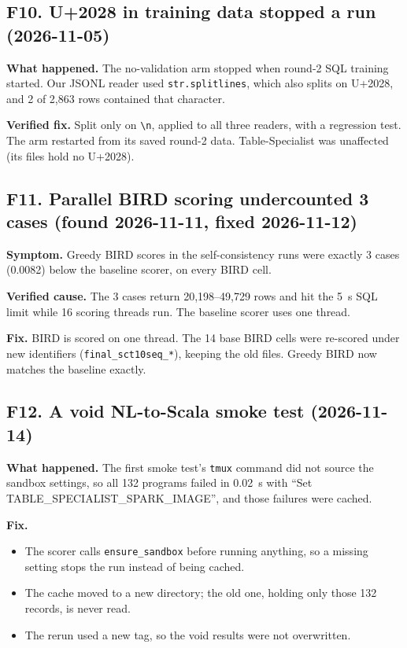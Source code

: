 \subsection{F10. U+2028 in training data stopped a run (2026-11-05)}
\begin{failbox}{}
\textbf{What happened.} The no-validation arm stopped when round-2 SQL training started. Our JSONL reader used
\texttt{str.splitlines}, which also splits on U+2028, and 2 of 2,863 rows contained that character.

\textbf{Verified fix.} Split only on \texttt{\textbackslash n}, applied to all three readers, with a regression test.
The arm restarted from its saved round-2 data. Table-Specialist was unaffected (its files hold no U+2028).
\end{failbox}

\subsection{F11. Parallel BIRD scoring undercounted 3 cases (found 2026-11-11, fixed 2026-11-12)}\label{sec:fail-bird}
\begin{failbox}{}
\textbf{Symptom.} Greedy BIRD scores in the self-consistency runs were exactly 3 cases (0.0082) below the baseline
scorer, on every BIRD cell.

\textbf{Verified cause.} The 3 cases return 20,198--49,729 rows and hit the 5~s SQL limit while 16 scoring threads
run. The baseline scorer uses one thread.

\textbf{Fix.} BIRD is scored on one thread. The 14 base BIRD cells were re-scored under new identifiers
(\texttt{final\_sct10seq\_*}), keeping the old files. Greedy BIRD now matches the baseline exactly.
\end{failbox}

\subsection{F12. A void NL-to-Scala smoke test (2026-11-14)}
\begin{failbox}{}
\textbf{What happened.} The first smoke test's \texttt{tmux} command did not source the sandbox settings, so all 132
programs failed in 0.02~s with ``Set TABLE\_SPECIALIST\_SPARK\_IMAGE'', and those failures were cached.

\textbf{Fix.}
\begin{itemize}
\item The scorer calls \texttt{ensure\_sandbox} before running anything, so a missing setting stops the run instead of
being cached.
\item The cache moved to a new directory; the old one, holding only those 132 records, is never read.
\item The rerun used a new tag, so the void results were not overwritten.
\end{itemize}
\end{failbox}

